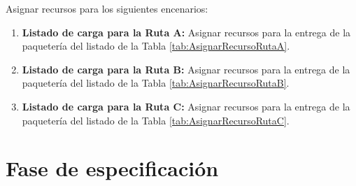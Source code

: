 \begin{table}[H]
  \centering
	\caption{\label{tab:AsignarRecursoRutaC}Lista de paquetes asignados a la Ruta C}
\end{table}

Asignar recursos para los siguientes encenarios:
\begin{enumerate}
	\item  \textbf{Listado de carga para la Ruta A:} Asignar recursos para la entrega de la paquetería del listado de la Tabla \ref{tab:AsignarRecursoRutaA}.
	\item  \textbf{Listado de carga para la Ruta B:} Asignar recursos para la entrega de la paquetería del listado de la Tabla \ref{tab:AsignarRecursoRutaB}.
 \item \textbf{Listado de carga para la Ruta C:} Asignar recursos para la entrega de la paquetería del listado de la Tabla \ref{tab:AsignarRecursoRutaC}.
\end{enumerate}

\section{Fase de especificación}
